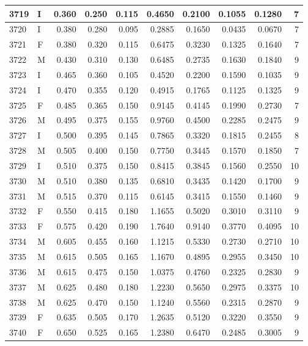 \documentclass[9pt,twocolumn,twoside,]{pnas-new}
\begin{document}
\begin{tabular}{l|l|r|r|r|r|r|r|r|r}
\hline
3719 & I & 0.360 & 0.250 & 0.115 & 0.4650 & 0.2100 & 0.1055 & 0.1280 & 7\\
\hline
3720 & I & 0.380 & 0.280 & 0.095 & 0.2885 & 0.1650 & 0.0435 & 0.0670 & 7\\
\hline
3721 & F & 0.380 & 0.320 & 0.115 & 0.6475 & 0.3230 & 0.1325 & 0.1640 & 7\\
\hline
3722 & M & 0.430 & 0.310 & 0.130 & 0.6485 & 0.2735 & 0.1630 & 0.1840 & 9\\
\hline
3723 & I & 0.465 & 0.360 & 0.105 & 0.4520 & 0.2200 & 0.1590 & 0.1035 & 9\\
\hline
3724 & I & 0.470 & 0.355 & 0.120 & 0.4915 & 0.1765 & 0.1125 & 0.1325 & 9\\
\hline
3725 & F & 0.485 & 0.365 & 0.150 & 0.9145 & 0.4145 & 0.1990 & 0.2730 & 7\\
\hline
3726 & M & 0.495 & 0.375 & 0.155 & 0.9760 & 0.4500 & 0.2285 & 0.2475 & 9\\
\hline
3727 & I & 0.500 & 0.395 & 0.145 & 0.7865 & 0.3320 & 0.1815 & 0.2455 & 8\\
\hline
3728 & M & 0.505 & 0.400 & 0.150 & 0.7750 & 0.3445 & 0.1570 & 0.1850 & 7\\
\hline
3729 & I & 0.510 & 0.375 & 0.150 & 0.8415 & 0.3845 & 0.1560 & 0.2550 & 10\\
\hline
3730 & M & 0.510 & 0.380 & 0.135 & 0.6810 & 0.3435 & 0.1420 & 0.1700 & 9\\
\hline
3731 & M & 0.515 & 0.370 & 0.115 & 0.6145 & 0.3415 & 0.1550 & 0.1460 & 9\\
\hline
3732 & F & 0.550 & 0.415 & 0.180 & 1.1655 & 0.5020 & 0.3010 & 0.3110 & 9\\
\hline
3733 & F & 0.575 & 0.420 & 0.190 & 1.7640 & 0.9140 & 0.3770 & 0.4095 & 10\\
\hline
3734 & M & 0.605 & 0.455 & 0.160 & 1.1215 & 0.5330 & 0.2730 & 0.2710 & 10\\
\hline
3735 & M & 0.615 & 0.505 & 0.165 & 1.1670 & 0.4895 & 0.2955 & 0.3450 & 10\\
\hline
3736 & M & 0.615 & 0.475 & 0.150 & 1.0375 & 0.4760 & 0.2325 & 0.2830 & 9\\
\hline
3737 & M & 0.625 & 0.480 & 0.180 & 1.2230 & 0.5650 & 0.2975 & 0.3375 & 10\\
\hline
3738 & M & 0.625 & 0.470 & 0.150 & 1.1240 & 0.5560 & 0.2315 & 0.2870 & 9\\
\hline
3739 & F & 0.635 & 0.505 & 0.170 & 1.2635 & 0.5120 & 0.3220 & 0.3550 & 9\\
\hline
3740 & F & 0.650 & 0.525 & 0.165 & 1.2380 & 0.6470 & 0.2485 & 0.3005 & 9\\

\end{tabular}
\end{document}
